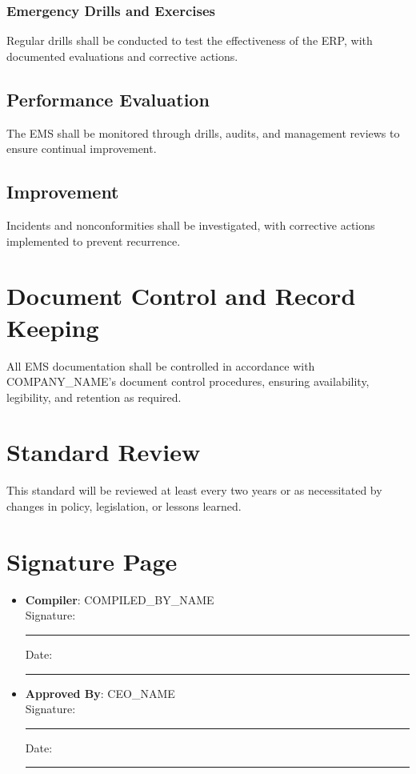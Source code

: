 \documentclass[11pt]{article}
\newcommand{\clientName}{{{COMPANY_NAME}}}
\newcommand{\compilerName}{{{COMPILED_BY_NAME}}}
\begin{document}
\subsubsection{Emergency Drills and Exercises}
Regular drills shall be conducted to test the effectiveness of the ERP, with documented evaluations and corrective actions.

\subsection{Performance Evaluation}
The EMS shall be monitored through drills, audits, and management reviews to ensure continual improvement.

\subsection{Improvement}
Incidents and nonconformities shall be investigated, with corrective actions implemented to prevent recurrence.

\section{Document Control and Record Keeping}
All EMS documentation shall be controlled in accordance with \clientName's document control procedures, ensuring availability, legibility, and retention as required.

\section{Standard Review}
This standard will be reviewed at least every two years or as necessitated by changes in policy, legislation, or lessons learned.

\section{Signature Page}
\begin{itemize}
  \item \textbf{Compiler}: \compilerName \\
    Signature: \rule{5cm}{0.4pt} \quad Date: \rule{3cm}{0.4pt}
  \item \textbf{Approved By}: {{CEO_NAME}} \\
    Signature: \rule{5cm}{0.4pt} \quad Date: \rule{3cm}{0.4pt}
\end{itemize}
\end{document}
